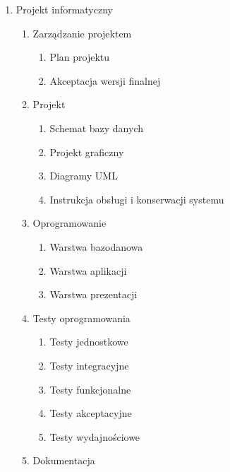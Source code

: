 \begin{enumerate}
\item Projekt informatyczny

\begin{enumerate}

\item Zarządzanie projektem

\begin{enumerate}

\item Plan projektu
\item Akceptacja wersji finalnej

\end{enumerate}

\item Projekt

\begin{enumerate}

\item Schemat bazy danych
\item Projekt graficzny
\item Diagramy UML
\item Instrukcja obsługi i konserwacji systemu

\end{enumerate}

\item Oprogramowanie

\begin{enumerate}

\item Warstwa bazodanowa
\item Warstwa aplikacji
\item Warstwa prezentacji

\end{enumerate}

\item Testy oprogramowania

\begin{enumerate}

\item Testy jednostkowe
\item Testy integracyjne
\item Testy funkcjonalne
\item Testy akceptacyjne
\item Testy wydajnościowe

\end{enumerate}

\item Dokumentacja


\end{enumerate}
\end{enumerate}

